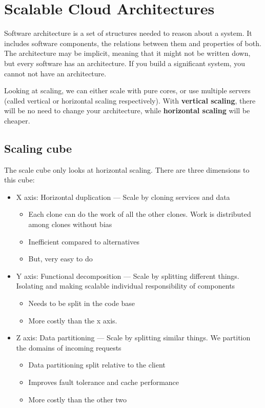 \documentclass[11pt,a4paper,titlepage,dvipsnames,cmyk]{scrartcl}
\begin{document}
\section{Scalable Cloud Architectures}
Software architecture is a set of structures needed to reason about a system. It includes software components, the relations between them and properties of both. The architecture may be implicit, meaning that it might not be written down, but every software has an architecture. If you build a significant system, you cannot not have an architecture.

Looking at scaling, we can either scale with pure cores, or use multiple servers (called vertical or horizontal scaling respectively). With \textbf{vertical scaling}, there will be no need to change your architecture, while \textbf{horizontal scaling} will be cheaper.

\subsection{Scaling cube}
The scale cube only looks at horizontal scaling. There are three dimensions to this cube:
\begin{itemize}
    \item X axis: Horizontal duplication --- Scale by cloning services and data
    \begin{itemize}
        \item Each clone can do the work of all the other clones. Work is distributed among clones without bias
        \item Inefficient compared to alternatives
        \item But, very easy to do
    \end{itemize}
    \item Y axis: Functional decomposition --- Scale by splitting different things. Isolating and making scalable individual responsibility of components
    \begin{itemize}
        \item Needs to be split in the code base
        \item More costly than the x axis.
    \end{itemize}
    \item Z axis: Data partitioning --- Scale by splitting similar things. We partition the domains of incoming requests
    \begin{itemize}
        \item Data partitioning split relative to the client
        \item Improves fault tolerance and cache  performance
        \item More costly than the other two
    \end{itemize}
\end{itemize}
\end{document}
